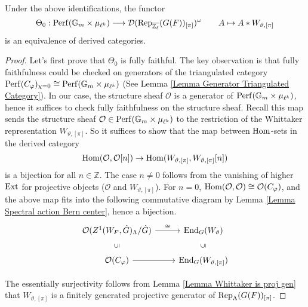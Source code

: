 \begin{proposition}
	Under the above identifications, the functor
	$$\Theta_0: \operatorname{\operatorname{Perf}}(\mathbb{G}_m \times \mu_{\ell^k}) \longrightarrow \mathcal{D}(\operatorname{\operatorname{Rep}}_{\overline{\mathbb{Z}_{\ell}}}(G(F))_{[\pi]})^{\omega} \qquad A \mapsto A*W_{\vartheta, [\pi]}$$
	is an equivalence of derived categories.
\end{proposition}


\begin{proof}
	Let's first prove that $\Theta_0$ is fully faithful. The key observation is that fully faithfulness could be checked on generators of the triangulated category $\operatorname{\operatorname{Perf}}(C_{\varphi})_{\chi=0} \cong \operatorname{\operatorname{Perf}}(\mathbb{G}_m \times \mu_{\ell^k})$ (See Lemma \ref{Lemma Generator Triangulated Category}). In our case, the structure sheaf $\mathcal{O}$ is a generator of $\operatorname{\operatorname{Perf}}(\mathbb{G}_m \times \mu_{\ell^k})$, hence it suffices to check fully faithfulness on the structure sheaf. Recall this map sends the structure sheaf $\mathcal{O} \in \operatorname{\operatorname{Perf}}(\mathbb{G}_m \times \mu_{\ell^k})$ to the restriction of the Whittaker representation $W_{\vartheta, [\pi]}$. So it suffices to show that the map between $\operatorname{\operatorname{Hom}}$-sets in the derived category
	$$\operatorname{\operatorname{Hom}}(\mathcal{O}, \mathcal{O}[n]) \to \operatorname{\operatorname{Hom}}(W_{\vartheta, [\pi]}, W_{\vartheta, [\pi]}[n])$$
	is a bijection for all $n \in \mathbb{Z}$. The case $n \neq 0$ follows from the vanishing of higher $\operatorname{\operatorname{Ext}}$ for projective objects ($\mathcal{O}$ and $W_{\vartheta, [\pi]}$). For $n=0$, $\operatorname{\operatorname{Hom}}(\mathcal{O}, \mathcal{O}) \cong \mathcal{O}(C_{\varphi})$, and the above map fits into the following commutative diagram by Lemma \ref{Lemma Spectral action Bern center}, hence a bijection.
		\[\begin{tikzcd}
			{\mathcal{O}(Z^1(W_F, \hat{G})_{\Lambda}/\hat{G})} & {\End_{G}(W_{\vartheta})} \\
			{\mathcal{O}(C_{\varphi})} & {\End_{G}(W_{\vartheta, [\pi]})}
			\arrow[from=2-1, to=2-2]
			\arrow["\subseteq"{description}, sloped, draw=none, from=2-1, to=1-1]
			\arrow["\subseteq"{description}, sloped, draw=none, from=2-2, to=1-2]
			\arrow["\cong", from=1-1, to=1-2]
		\end{tikzcd}\]
		
	
	The essentially surjectivity follows from Lemma \ref{Lemma Whittaker is proj gen} that $W_{\vartheta, [\pi]}$ is a finitely generated projective generator of $\operatorname{\operatorname{Rep}}_{\Lambda}(G(F))_{[\pi]}$.
	
\end{proof}

